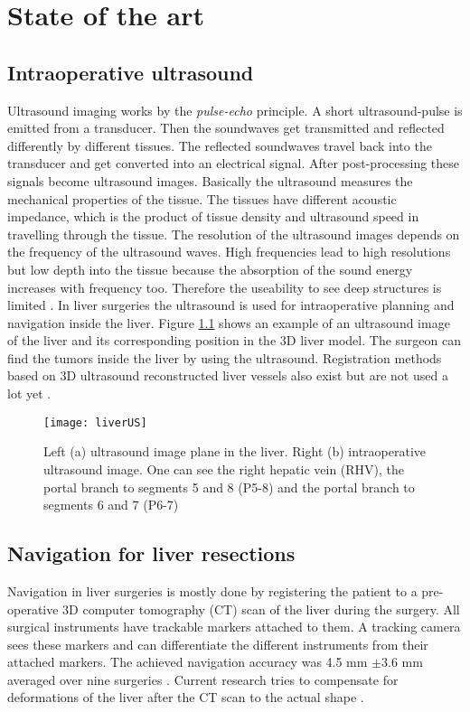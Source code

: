 \chapter{State of the art}

\section{Intraoperative ultrasound}
Ultrasound imaging works by the \textit{pulse-echo} principle. A short
ultrasound-pulse is emitted from a transducer. Then the soundwaves get
transmitted and reflected differently by different tissues. The reflected
soundwaves travel back into the transducer and get converted into an electrical
signal. After post-processing these signals become ultrasound images. Basically
the ultrasound measures the mechanical properties of the tissue. The tissues
have different acoustic impedance, which is the product of tissue density and
ultrasound speed in travelling through the tissue. The resolution of the
ultrasound images depends on the frequency of the ultrasound waves. High
frequencies lead to high resolutions but low depth into the tissue because the
absorption of the sound energy increases with frequency too. Therefore the
useability to see deep structures is limited \cite{torzilli2014ultrasound}. In
liver surgeries the ultrasound is used for intraoperative planning and
navigation inside the liver. Figure \ref{fig:liverUS} shows an example of an
ultrasound image of the liver and its corresponding position in the 3D liver
model. The surgeon can find the tumors inside the liver by using the ultrasound.
Registration methods based on 3D ultrasound reconstructed liver vessels also
exist but are not used a lot yet \cite{lange2003vessel}.

\begin{figure}[H]
  \centering
 \texttt{[image: liverUS]}
 \caption{ Left (a) ultrasound image plane in the liver. Right (b) intraoperative
   ultrasound image. One can see the right hepatic vein (RHV), the portal branch
   to segments 5 and 8 (P5-8) and the portal branch to segments 6 and 7 (P6-7) \cite{torzilli2014ultrasound}}
  \label{fig:liverUS}
\end{figure}

\section{Navigation for liver resections}
Navigation in liver surgeries is mostly done by registering the patient to a pre-operative 3D
computer tomography (CT) scan of the liver during the surgery. All surgical
instruments have trackable markers attached to them. A tracking camera sees
these markers and can differentiate the different instruments from their attached
markers. The achieved
navigation accuracy was 4.5 mm $\pm$3.6 mm averaged over nine surgeries \cite{peterhans2011navigation}.
Current research tries to compensate for deformations of the liver after the CT
scan to the actual shape \cite{clements2017deformation}
\cite{clements2015validation}. 

